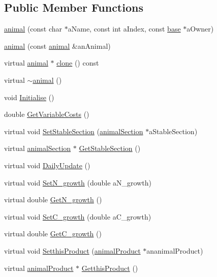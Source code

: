 \subsection*{Public Member Functions}
\begin{DoxyCompactItemize}
\item 
\hyperlink{classanimal_a01eae0aa68a191b48c488814fbec49ad}{animal} (const char $\ast$aName, const int aIndex, const \hyperlink{classbase}{base} $\ast$aOwner)
\item 
\hyperlink{classanimal_ac9bcedb7d063e6917acb53242e65750a}{animal} (const \hyperlink{classanimal}{animal} \&anAnimal)
\item 
virtual \hyperlink{classanimal}{animal} $\ast$ \hyperlink{classanimal_a0dcbd91d8e8eddffa86451dab017f2aa}{clone} () const 
\item 
virtual \hyperlink{classanimal_a4bee7f96358304ed6500f5cc2064dcc9}{$\sim$animal} ()
\item 
void \hyperlink{classanimal_a06e14e53c94c2184ec43993b78b8d74b}{Initialise} ()
\item 
double \hyperlink{classanimal_a65c63e46f48ed826735c7eb075c36ae3}{GetVariableCosts} ()
\item 
virtual void \hyperlink{classanimal_a258dbe20d150fc63fd99a08c28484a2c}{SetStableSection} (\hyperlink{classanimal_section}{animalSection} $\ast$aStableSection)
\item 
virtual \hyperlink{classanimal_section}{animalSection} $\ast$ \hyperlink{classanimal_a99d20eac6b06d781c35cf3f6fa9f5139}{GetStableSection} ()
\item 
virtual void \hyperlink{classanimal_a96c8db4af03ae55b4acb96ed250ea065}{DailyUpdate} ()
\item 
virtual void \hyperlink{classanimal_a80c4d74b88eb18cb48c4abe1a327d8ce}{SetN\_\-growth} (double aN\_\-growth)
\item 
virtual double \hyperlink{classanimal_a3bb4b70145b39791d77634f0a51435b9}{GetN\_\-growth} ()
\item 
virtual void \hyperlink{classanimal_a608092b77c96f9b667b5c4e7821a1db0}{SetC\_\-growth} (double aC\_\-growth)
\item 
virtual double \hyperlink{classanimal_a231533408e9e70e7278b7f3c352939a1}{GetC\_\-growth} ()
\item 
virtual void \hyperlink{classanimal_a1c0454fe63d9eb95b59178f0a1700f1f}{SetthisProduct} (\hyperlink{classanimal_product}{animalProduct} $\ast$ananimalProduct)
\item 
virtual \hyperlink{classanimal_product}{animalProduct} $\ast$ \hyperlink{classanimal_a877a5ba690a73859295c0b2150d4d99b}{GetthisProduct} ()

\end{DoxyCompactItemize}
